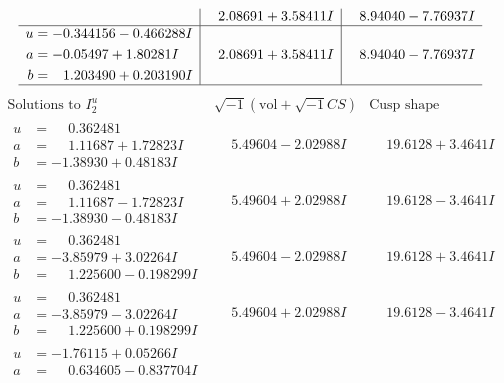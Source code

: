 \documentclass[1p]{elsarticle_modified}
\theoremstyle{definition}
\newcommand{\I}{\sqrt{-1}}
\begin{document}
$$\begin{array}{c|c|c}
 & \phantom{-}2.08691 + 3.58411 I & \phantom{-}8.94040 - 7.76937 I \\ \hline\begin{aligned}
u &= -0.344156 - 0.466288 I \\
a &= -0.05497 + 1.80281 I \\
b &= \phantom{-}1.203490 + 0.203190 I\end{aligned}
 & \phantom{-}2.08691 + 3.58411 I & \phantom{-}8.94040 - 7.76937 I\\
 \hline 
 \end{array}$$\newpage$$\begin{array}{c|c|c}  
\text{Solutions to }I^u_{2}& \I (\text{vol} + \sqrt{-1}CS) & \text{Cusp shape}\\
 \hline 
\begin{aligned}
u &= \phantom{-}0.362481\phantom{ +0.000000I} \\
a &= \phantom{-}1.11687 + 1.72823 I \\
b &= -1.38930 + 0.48183 I\end{aligned}
 & \phantom{-}5.49604 - 2.02988 I & \phantom{-}19.6128 + 3.4641 I \\ \hline\begin{aligned}
u &= \phantom{-}0.362481\phantom{ +0.000000I} \\
a &= \phantom{-}1.11687 - 1.72823 I \\
b &= -1.38930 - 0.48183 I\end{aligned}
 & \phantom{-}5.49604 + 2.02988 I & \phantom{-}19.6128 - 3.4641 I \\ \hline\begin{aligned}
u &= \phantom{-}0.362481\phantom{ +0.000000I} \\
a &= -3.85979 + 3.02264 I \\
b &= \phantom{-}1.225600 - 0.198299 I\end{aligned}
 & \phantom{-}5.49604 - 2.02988 I & \phantom{-}19.6128 + 3.4641 I \\ \hline\begin{aligned}
u &= \phantom{-}0.362481\phantom{ +0.000000I} \\
a &= -3.85979 - 3.02264 I \\
b &= \phantom{-}1.225600 + 0.198299 I\end{aligned}
 & \phantom{-}5.49604 + 2.02988 I & \phantom{-}19.6128 - 3.4641 I \\ \hline\begin{aligned}
u &= -1.76115 + 0.05266 I \\
a &= \phantom{-}0.634605 - 0.837704 I \\

\end{aligned}
\end{array}$$
\end{document}
